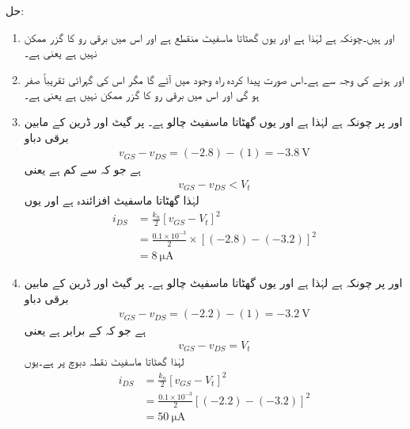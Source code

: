 حل:
\begin{enumerate}
\item
{} اور   ہیں۔چونکہ   ہے لہٰذا  ہے اور یوں گھٹاتا ماسفیٹ منقطع ہے اور اس میں برقی رو کا گزر ممکن نہیں ہے یعنی  ہے۔
\item
{} اور   ہونے کی وجہ سے  ہے۔اس صورت پیدا کردہ راہ وجود میں آئے گا مگر اس کی گہرائی تقریباً صفر ہو گی اور اس میں برقی رو کا گزر ممکن نہیں ہے یعنی   ہے۔

\item

 اور  	 پر چونکہ   ہے لہٰذا  ہے اور یوں گھٹاتا ماسفیٹ چالو ہے۔  پر گیٹ اور ڈرین کے مابین برقی دباو
\begin{align*}
v_{GS}-v_{DS}=(-2.8)-(1)=\SI{-3.8}{\volt}
\end{align*}
ہے جو کہ   سے کم ہے یعنی
\begin{align*}
v_{GS}-v_{DS}<V_t
\end{align*}
لہٰذا گھٹاتا ماسفیٹ افزائندہ ہے اور یوں
\begin{align*}
i_{DS}&=\frac{k_n}{2} \left[v_{GS}-V_t \right]^2 \\
&=\frac{0.1 \times 10^{-3}}{2} \times \left[(-2.8)-(-3.2) \right]^{2}\\
&=\SI{8}{\micro \ampere}
\end{align*}
\item
{} اور  	 پر چونکہ    ہے لہٰذا  ہے اور یوں گھٹاتا ماسفیٹ چالو ہے۔  پر گیٹ اور ڈرین کے مابین برقی دباو
\begin{align*}
v_{GS}-v_{DS}=(-2.2)-(1)=\SI{-3.2}{\volt}
\end{align*}
ہے جو کہ  کے برابر ہے  یعنی
\begin{align*}
v_{GS}-v_{DS}=V_t
\end{align*}
لہٰذا گھٹاتا ماسفیٹ نقطہ دبوچ پر ہے۔یوں
\begin{align*}
i_{DS}&=\frac{k_n}{2} \left[v_{GS}-V_t \right ]^2  \\
&=\frac{0.1 \times 10^{-3}}{2} \left[(-2.2)-(-3.2) \right ]^2 \\
&=\SI{50}{\micro \ampere}
\end{align*}

\end{enumerate}
